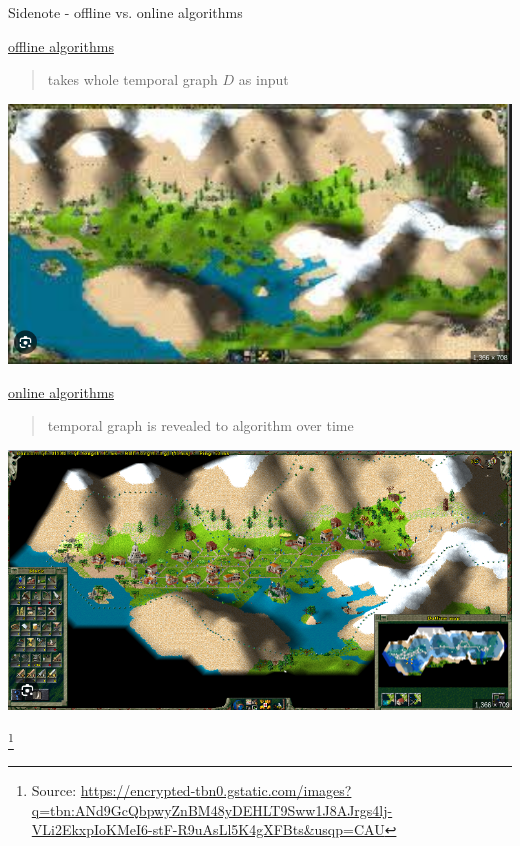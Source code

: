 \documentclass{beamer}
\newcommand{\sourcefootnote}[1]{\let\thefootnote\relax\footnote{{\tiny Source: \url{#1}}}}
\begin{document}
\begin{frame}{Sidenote - offline vs. online algorithms}
  \begin{minipage}{0.45\textwidth}
    \underline{offline algorithms}
    \begin{quote}
      takes whole temporal graph $D$ as input\\
    \end{quote}
    \includegraphics[width=\linewidth]{media/offline_algorithm.png}
  \end{minipage} \hfill 
  \begin{minipage}{0.45\textwidth}
    \underline{online algorithms}
    \begin{quote}
    temporal graph is revealed to algorithm over time
    \end{quote}
    \includegraphics[width=\linewidth]{media/online_algo.png}
  \end{minipage}
  \sourcefootnote{https://encrypted-tbn0.gstatic.com/images?q=tbn:ANd9GcQbpwyZnBM48yDEHLT9Sww1J8AJrgs4lj-VLi2EkxpIoKMeI6-stF-R9uAsLl5K4gXFBts&usqp=CAU}

\end{frame}
\end{document}
